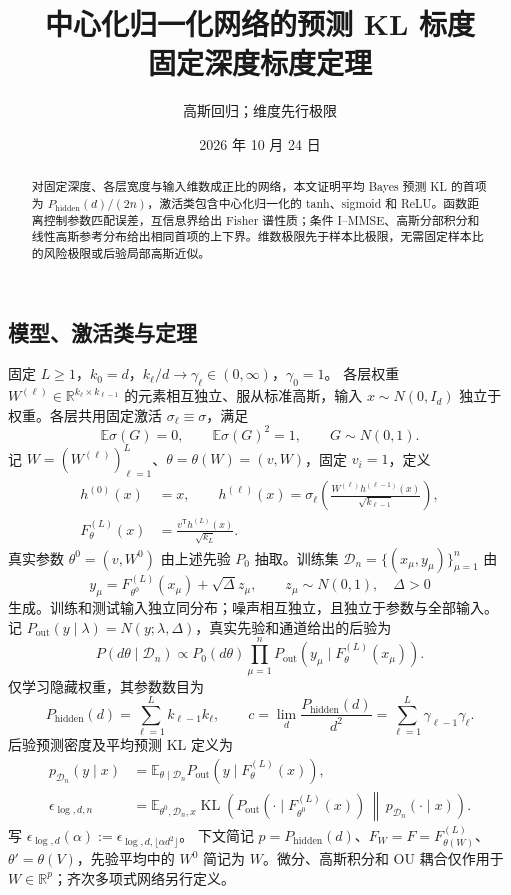\documentclass[a4paper]{tufte-handout}
\title{\texorpdfstring{中心化归一化网络的预测 KL 标度\\固定深度标度定理}{中心化归一化网络的预测 KL 标度：固定深度标度定理}}
\author{高斯回归；维度先行极限}
\date{2026 年 10 月 24 日}
\newcommand{\E}{\mathbb E}
\newcommand{\R}{\mathbb R}
\newcommand{\Pall}{P_{\mathrm{hidden}}}
\newcommand{\Pout}{P_{\mathrm{out}}}
\DeclareMathOperator{\KL}{KL}
\begin{document}
\maketitle
\begin{abstract}
对固定深度、各层宽度与输入维数成正比的网络，本文证明平均 Bayes 预测 KL 的首项为 $\Pall(d)/(2n)$，激活类包含中心化归一化的 tanh、sigmoid 和 ReLU。函数距离控制参数匹配误差，互信息界给出 Fisher 谱性质；条件 I--MMSE、高斯分部积分和线性高斯参考分布给出相同首项的上下界。维数极限先于样本比极限，无需固定样本比的风险极限或后验局部高斯近似。
\end{abstract}
\begin{fullwidth}

\section{模型、激活类与定理}
固定 $L\ge1$，$k_0=d$，$k_\ell/d\to\gamma_\ell\in(0,\infty)$，$\gamma_0=1$。
各层权重 $W^{(\ell)}\in\R^{k_\ell\times k_{\ell-1}}$ 的元素相互独立、服从标准高斯，输入 $x\sim N(0,I_d)$ 独立于权重。各层共用固定激活 $\sigma_\ell\equiv\sigma$，满足
\[
\E\sigma(G)=0,\qquad\E\sigma(G)^2=1,\qquad G\sim N(0,1).
\]
记 $W=(W^{(\ell)})_{\ell=1}^L$、$\theta=\theta(W)=(v,W)$，固定 $v_i=1$，定义
\begin{equation}\begin{aligned}
h^{(0)}(x)&=x,\qquad
h^{(\ell)}(x)=\sigma_\ell\!\left(\frac{W^{(\ell)}h^{(\ell-1)}(x)}{\sqrt{k_{\ell-1}}}\right),\\
F_\theta^{(L)}(x)&=\frac{v^{\mathsf T}h^{(L)}(x)}{\sqrt{k_L}}.
\end{aligned}\end{equation}
真实参数 $\theta^0=(v,W^0)$ 由上述先验 $P_0$ 抽取。训练集 $\mathcal D_n=\{(x_\mu,y_\mu)\}_{\mu=1}^n$ 由
\[
y_\mu=F_{\theta^0}^{(L)}(x_\mu)+\sqrt\Delta z_\mu,\qquad
z_\mu\sim N(0,1),\quad\Delta>0
\]
生成。训练和测试输入独立同分布；噪声相互独立，且独立于参数与全部输入。
记 $\Pout(y\mid\lambda)=N(y;\lambda,\Delta)$，真实先验和通道给出的后验为
\[
P(d\theta\mid\mathcal D_n)\propto P_0(d\theta)
\prod_{\mu=1}^n\Pout\!\left(y_\mu\mid F_\theta^{(L)}(x_\mu)\right).
\]
仅学习隐藏权重，其参数数目为
\[
\Pall(d)=\sum_{\ell=1}^Lk_{\ell-1}k_\ell,\qquad
c=\lim_d\frac{\Pall(d)}{d^2}
=\sum_{\ell=1}^L\gamma_{\ell-1}\gamma_\ell.
\]
后验预测密度及平均预测 KL 定义为
\begin{equation}\begin{aligned}
p_{\mathcal D_n}(y\mid x)
&=\E_{\theta\mid\mathcal D_n}\Pout\!\left(y\mid F_\theta^{(L)}(x)\right),\\
\epsilon_{\log,d,n}
&=\E_{\theta^0,\mathcal D_n,x}\KL\!\left(
\Pout\!\left(\cdot\mid F_{\theta^0}^{(L)}(x)\right)
\,\middle\|\,p_{\mathcal D_n}(\cdot\mid x)\right).
\end{aligned}\end{equation}
写 $\epsilon_{\log,d}(\alpha):=\epsilon_{\log,d,\lfloor\alpha d^2\rfloor}$。
下文简记 $p=\Pall(d)$、$F_W=F=F_{\theta(W)}^{(L)}$、$\theta'=\theta(V)$，先验平均中的 $W^0$ 简记为 $W$。微分、高斯积分和 OU 耦合仅作用于 $W\in\R^p$；齐次多项式网络另行定义。


\end{fullwidth}
\end{document}
